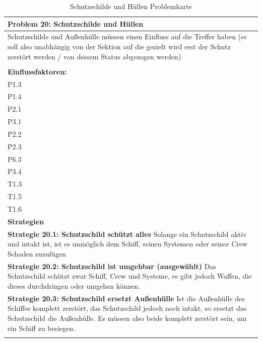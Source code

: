 \documentclass[fontsize=12pt,paper=a4,twoside]{scrartcl}
\begin{document}
\begin{table}[H]
    \centering
    \begin{tabular}{|p{15cm}|}
    \hline
          \textbf{Problem 20: Schutzschilde und Hüllen }  \\ \hline
	Schutzschilde und Außenhülle müssen einen Einfluss auf die Treffer haben (es soll also unabhängig von der Sektion auf die gezielt wird erst der Schutz zerstört werden / von dessem Status abgezogen werden). \\
         \\ \hline
          \textbf{Einflussfaktoren: } \\
	P1.3 \\
	P1.4 \\
	P2.1 \\
	P3.1 \\
	P2.2 \\
	P2.3 \\
	P6.3 \\
	P3.4 \\
	T1.3 \\
	T1.5 \\
	T1.6 \\
          \hline
          \textbf{Strategien} \\ \hline
            {}          
           \label{strategie:20.1}     
          \textbf{Strategie 20.1: Schutzschild schützt alles} Solange ein Schutzschild aktiv und intakt ist, ist es unmöglich dem Schiff, seinen Systemen oder seiner Crew Schaden zuzufügen  \\        
  {}          
           \label{strategie:20.2}              
          \textbf{Strategie 20.2: Schutzschild ist umgehbar (ausgewählt)} Das Schutzschild schützt zwar Schiff, Crew und Systeme, es gibt jedoch Waffen, die dieses durchdringen oder umgehen können.  \\
	 {}          
           \label{strategie:20.3}     
          \textbf{Strategie 20.3: Schutzschild ersetzt Außenhülle} Ist die Außenhülle des Schiffes komplett zerstört, das Schutzschild jedoch noch intakt, so ersetzt das Schutzschild die Außenhülle. Es müssen also beide komplett zerstört sein, um ein Schiff zu besiegen.  \\ 
	 \\ \hline
    \end{tabular}

    \caption{Schutzschilde und Hüllen Problemkarte}
    \label{tab:ProblemKarte20}
\end{table}
\end{document}
